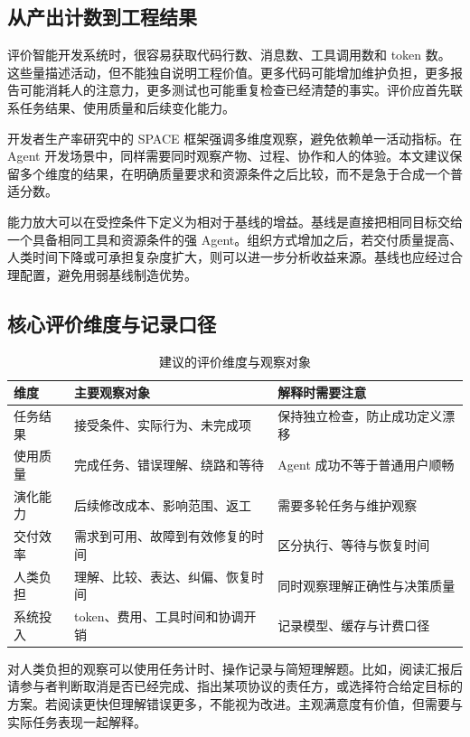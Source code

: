\label{sec:evaluation}
\subsection{从产出计数到工程结果}
评价智能开发系统时，很容易获取代码行数、消息数、工具调用数和 token 数。这些量描述活动，但不能独自说明工程价值。更多代码可能增加维护负担，更多报告可能消耗人的注意力，更多测试也可能重复检查已经清楚的事实。评价应首先联系任务结果、使用质量和后续变化能力。

开发者生产率研究中的 SPACE 框架强调多维度观察，避免依赖单一活动指标\cite{space}。在 Agent 开发场景中，同样需要同时观察产物、过程、协作和人的体验。本文建议保留多个维度的结果，在明确质量要求和资源条件之后比较，而不是急于合成一个普适分数。

能力放大可以在受控条件下定义为相对于基线的增益。基线是直接把相同目标交给一个具备相同工具和资源条件的强 Agent。组织方式增加之后，若交付质量提高、人类时间下降或可承担复杂度扩大，则可以进一步分析收益来源。基线也应经过合理配置，避免用弱基线制造优势。

\subsection{核心评价维度与记录口径}
\begin{table}[htbp]\centering\small
\caption{建议的评价维度与观察对象}\label{tab:metrics}
\begin{tabularx}{\linewidth}{p{2.6cm}YY}\toprule
维度 & 主要观察对象 & 解释时需要注意\\\midrule
任务结果 & 接受条件、实际行为、未完成项 & 保持独立检查，防止成功定义漂移\\
使用质量 & 完成任务、错误理解、绕路和等待 & Agent 成功不等于普通用户顺畅\\
演化能力 & 后续修改成本、影响范围、返工 & 需要多轮任务与维护观察\\
交付效率 & 需求到可用、故障到有效修复的时间 & 区分执行、等待与恢复时间\\
人类负担 & 理解、比较、表达、纠偏、恢复时间 & 同时观察理解正确性与决策质量\\
系统投入 & token、费用、工具时间和协调开销 & 记录模型、缓存与计费口径\\\bottomrule
\end{tabularx}\end{table}

对人类负担的观察可以使用任务计时、操作记录与简短理解题。比如，阅读汇报后请参与者判断取消是否已经完成、指出某项协议的责任方，或选择符合给定目标的方案。若阅读更快但理解错误更多，不能视为改进。主观满意度有价值，但需要与实际任务表现一起解释。

